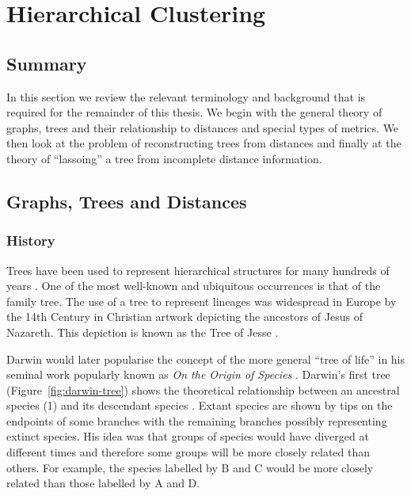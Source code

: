 \chapter{Hierarchical Clustering}
\label{cha:background2}

\section{Summary}
\label{sec:summary}

In this section we review the relevant terminology and background that is
required for the remainder of this thesis.  We begin with the general theory
of graphs, trees and their relationship to distances and special types of
metrics.  We then look at the problem of reconstructing trees from distances and
finally at the theory of ``lassoing'' a tree from incomplete distance
information.

\section{Graphs, Trees and Distances}
\label{sec:graphs-trees-dist}

\subsection{History}
\label{sec:history}

Trees have been used to represent hierarchical structures for many hundreds of
years \cite{knuth97taocp1}.  One of the most well-known and ubiquitous
occurrences is that of the family tree.  The use of a tree to represent
lineages was widespread in Europe by the 14th Century in Christian artwork
depicting the ancestors of Jesus of Nazareth.  This depiction is known as the
Tree of Jesse \cite{corblet1860etude}.

Darwin would later popularise the concept of the more general ``tree of life''
in his seminal work popularly known as \textit{On the Origin of Species}
\cite{darwin1859origin}.  Darwin's first tree (Figure~\ref{fig:darwin-tree})
shows the theoretical relationship between an ancestral species (1) and its
descendant species \cite{semple2003phylogenetics}.  Extant species are shown
by tips on the endpoints of some branches with the remaining branches possibly
representing extinct species.  His idea was that groups of species would have
diverged at different times and therefore some groups will be more closely
related than others.  For example, the species labelled by B and C would be
more closely related than those labelled by A and D.

